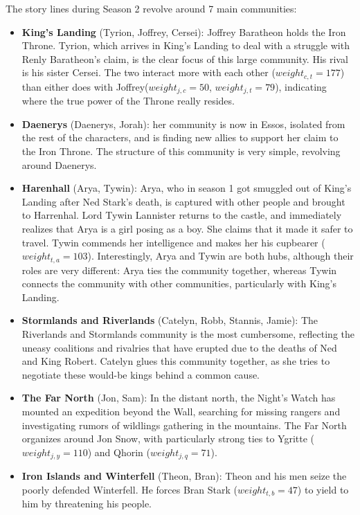 \documentclass[10pt,twocolumn,letterpaper]{article}
\begin{document}
The story lines during Season 2 revolve around 7 main communities:

\begin{itemize}
    \item \textbf{King's Landing} (Tyrion, Joffrey, Cersei): Joffrey Baratheon holds the Iron Throne. Tyrion, which arrives in King's Landing to deal with a struggle with Renly Baratheon's claim, is the clear focus of this large community. His rival is his sister Cersei. The two interact more with each other ($weight_{c,t}=177$) than either does with Joffrey($weight_{j,c}=50$, $weight_{j,t}=79$), indicating where the true power of the Throne really resides.
    \item \textbf{Daenerys} (Daenerys, Jorah): her community is now in Essos, isolated from the rest of the characters, and is finding new allies to support her claim to the Iron Throne. The structure of this community is very simple, revolving around Daenerys.
    \item \textbf{Harenhall} (Arya, Tywin): Arya, who in season 1 got smuggled out of King's Landing after Ned Stark's death, is captured with other people and brought to Harrenhal. Lord Tywin Lannister returns to the castle, and immediately realizes that Arya is a girl posing as a boy. She claims that it made it safer to travel. Tywin commends her intelligence and makes her his cupbearer ($weight_{t,a}=103$). 
    Interestingly, Arya and Tywin are both hubs, although their roles are very different: Arya ties the community together, whereas Tywin connects the community with other communities, particularly with King's Landing.
    \item  \textbf{Stormlands and Riverlands} (Catelyn, Robb, Stannis, Jamie): The Riverlands and Stormlands community is the most cumbersome, reflecting the uneasy coalitions and rivalries that have erupted due to the deaths of Ned and King Robert. Catelyn glues this community together, as she tries to negotiate these would-be kings behind a common cause.
    \item  \textbf{The Far North} (Jon, Sam):  In the distant north, the Night's Watch has mounted an expedition beyond the Wall, searching for missing rangers and investigating rumors of wildlings gathering in the mountains. The Far North organizes around Jon Snow, with particularly strong ties to Ygritte ($weight_{j,y}=110$) and Qhorin ($weight_{j,q}=71$).
    \item  \textbf{Iron Islands and Winterfell} (Theon, Bran): Theon and his men seize the poorly defended Winterfell. He forces Bran Stark ($weight_{t,b}=47$) to yield to him by threatening his people. 
    
\end{itemize}
\end{document}
